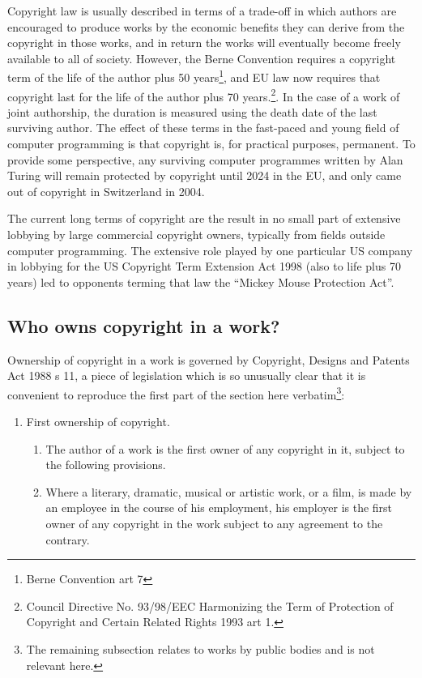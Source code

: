 \documentclass[a4paper,12pt]{article}
\newcommand{\CDPA}[1][]{Copyright, Designs and Patents Act 1988 #1\xspace}
\newcommand{\Berne}[1][]{Berne Convention #1\xspace}
\begin{document}
Copyright law is usually described in terms of a trade-off in which authors
are encouraged to produce works by the economic benefits they can derive
from the copyright in those works, and in return the works will eventually
become freely available to all of society. However, the Berne Convention
requires a copyright term of the life of the author plus 50 years\footnote{\Berne[art 7]}, and EU
law now requires that copyright last for the life of the author plus 70
years.\footnote{Council Directive No. 93/98/EEC Harmonizing
  the Term of Protection of Copyright and Certain Related Rights 1993 art
  1.}. In the case of a work of joint authorship, the duration is measured
using the death date of the last surviving author. The effect of these terms
in the fast-paced and young field of computer programming is that copyright
is, for practical purposes, permanent. To provide some perspective, any
surviving computer programmes written by Alan Turing will remain protected
by copyright until 2024 in the EU, and only came out of copyright in
Switzerland in 2004.

The current long terms of copyright are the result in no small part of
extensive lobbying by large commercial copyright owners, typically from
fields outside computer programming. The extensive role played by one
particular US company in lobbying for the US Copyright Term Extension Act 1998 (also to
life plus 70 years) led to opponents terming that law the ``Mickey Mouse
Protection Act''.

\subsection{Who owns copyright in a work?}
 
Ownership of copyright in a work is governed by \CDPA[s 11], a piece of
legislation which is so unusually clear that it is convenient to reproduce
the first part of the section here verbatim\footnote{The remaining subsection relates to works by public
  bodies and is not relevant here.}:
\begin{enumerate}
  \addtocounter{enumi}{10}
\item First ownership of copyright. 
  \renewcommand{\labelenumii}{(\arabic{enumii})}
  \begin{enumerate}
  \item The author of a work is the first owner of any copyright in it, subject to the following provisions.
  \item Where a literary, dramatic, musical or artistic work, or a film, is
    made by an employee in the course of his employment, his employer is the
    first owner of any copyright in the work subject to any agreement to the
    contrary.
  \end{enumerate}
\end{enumerate}
\end{document}
